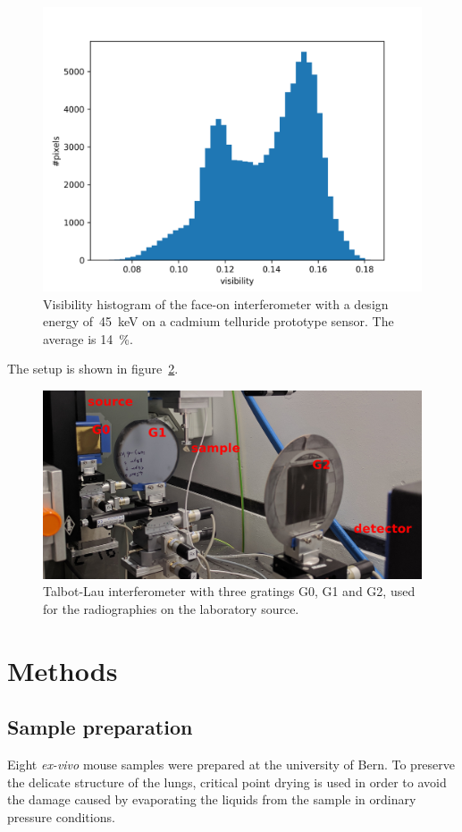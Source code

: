 \begin{figure}[htb]
    \centering
    \includegraphics[width=.8\textwidth]{gfx/visibility_titlis.png}
    \caption[Visibility of the face-on interferometer]{Visibility histogram of the face-on interferometer with a
        design energy of~\SI{45}{\kilo\eV} on a cadmium telluride prototype
        sensor. The average is
        \SI{14}{\percent}.}
    \label{fig:visibility-titlis}
\end{figure}

The setup is shown in figure~\ref{248327}.

\begin{figure}[htb]
    \centering
    \includegraphics[width=0.70\columnwidth]{gfx/lung-paper-figures/lung-setup/lung-setup}
    \caption[Photo of the Talbot-Lau interferometer for lung radiographies]{Talbot-Lau interferometer with three gratings G0, G1 and G2, used for
        the radiographies on the laboratory source.
        {\label{248327}}%
    }
\end{figure}

\section{Methods}\label{sec:methods}
\subsection{Sample preparation}
Eight \emph{ex-vivo} mouse samples were prepared at the university of Bern.
To preserve the delicate structure of the lungs, critical point
drying is used in order to avoid the damage caused by evaporating the liquids
from the sample in ordinary pressure conditions.

